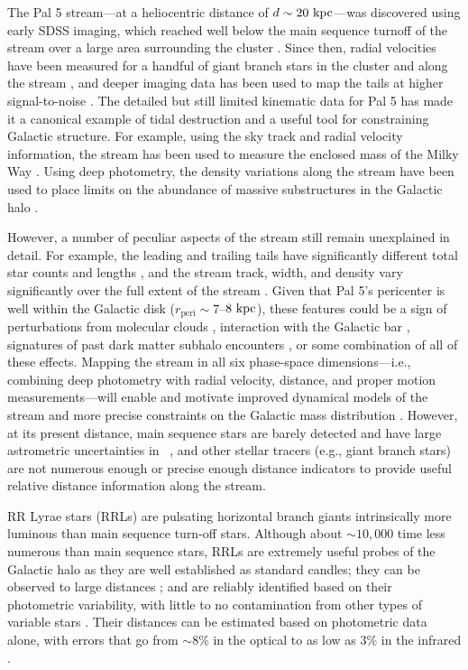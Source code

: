 \documentclass[twocolumn]{aastex63}
\begin{document}
The Pal 5 stream---at a heliocentric distance of $d \sim 20~\mathrm{kpc}$---was discovered using early SDSS imaging, which reached well below the main sequence turnoff of the stream over a large area surrounding the cluster \citep{Odenkirchen:2001, Rockosi:2002}.
Since then, radial velocities have been measured for a handful of giant branch stars in the cluster and along the stream \citep{Odenkirchen:2002, Odenkirchen:2009, Ibata:2017}, and deeper imaging data has been used to map the tails at higher signal-to-noise \citep{Bernard:2016, Ibata:2016, Bonaca:2019}.
The detailed but still limited kinematic data for Pal 5 has made it a canonical example of tidal destruction and a useful tool for constraining Galactic structure.
For example, using the sky track and radial velocity information, the stream has been used to measure the enclosed mass of the Milky Way \citep{Kuepper:2015, Bovy:2016}.
Using deep photometry, the density variations along the stream have been used to place limits on the abundance of massive substructures in the Galactic halo \citep{Erkal:2017}.

However, a number of peculiar aspects of the stream still remain unexplained in detail.
For example, the leading and trailing tails have significantly different total star counts and lengths \citep{Dehnen:2004, Bernard:2016}, and the stream track, width, and density vary significantly over the full extent of the stream \citep{Ibata:2016, Bonaca:2019}.
Given that Pal 5's pericenter is well within the Galactic disk ($r_{\textrm{peri}} \sim 7$--$8~\mathrm{kpc}$), these features could be a sign of perturbations from molecular clouds \citep[e.g.,][]{Amorisco:2016}, interaction with the Galactic bar \citep[e.g.,][]{Pearson:2017}, signatures of past dark matter subhalo encounters \citep[e.g.,][]{Erkal:2017}, or some combination of all of these effects.
Mapping the stream in all six phase-space dimensions---i.e., combining deep photometry with radial velocity, distance, and proper motion measurements---will enable and motivate improved dynamical models of the stream and more precise constraints on the Galactic mass distribution \citep[e.g.,][]{PriceWhelan:2013}.
However, at its present distance, main sequence stars are barely detected and have large astrometric uncertainties in \Gaia\ , and other stellar tracers (e.g., giant branch stars) are not numerous enough or precise enough distance indicators to provide useful relative distance information along the stream.

RR Lyrae stars (RRLs) are pulsating horizontal branch giants intrinsically more luminous than main sequence turn-off stars. Although about $\sim 10,000$ time less numerous than main sequence stars, RRLs are extremely useful probes of the Galactic halo as they are well established as standard candles; they can be observed to large distances \citep{Medina:2018,Sesar:2017c}; and are reliably identified based on their photometric variability, with little to no contamination from other types of variable stars \citep[e.g.]{Holl:2018,Drake:2017,Mateu:2012}.  Their distances can be estimated based on photometric data alone, with errors that go from $\sim8\%$ in the optical to as low as 3\% in the infrared \citep{Neeley:2017, Sesar:2017a}.
\end{document}
